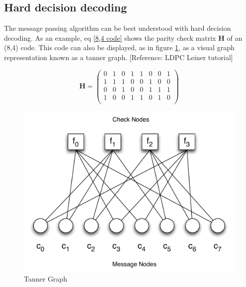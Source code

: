 \documentclass[11pt]{article}
\numberwithin{equation}{subsection}
\begin{document}
\subsection{Hard decision decoding}
The message passing algorithm can be best understood with hard decision decoding. As an example, eq \ref{8,4 code} shows the parity check matrix $\mathbf{H}$ of an (8,4) code. This code can also be displayed, as in figure \ref{figure:tanner graph}, as a visual graph representation known as a tanner graph. [Reference: LDPC Leiner tutorial]

\begin{equation} \label{8,4 code} 
\mathbf{H} = 
\left(
\begin{array}{cccccccc}
  0 & 1 & 0 & 1 & 1 & 0 & 0 & 1 \\
  1 & 1 & 1 & 0 & 0 & 1 & 0 & 0 \\
  0 & 0 & 1 & 0 & 0 & 1 & 1 & 1 \\
  1 & 0 & 0 & 1 & 1 & 0 & 1 & 0 \\
\end{array}
\right)
\end{equation}

\begin{figure}[h]
\centering
\includegraphics[scale=0.6]{tannergraph}
\caption{Tanner Graph}
\label{figure:tanner graph}
\end{figure}
\end{document}
